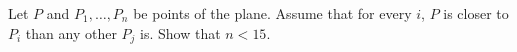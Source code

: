 Let $P$ and $P_1, \ldots, P_n$ be points of the plane. Assume that for every $i$, $P$ is closer to $P_i$ than any other $P_j$ is. Show that $n < 15$.
